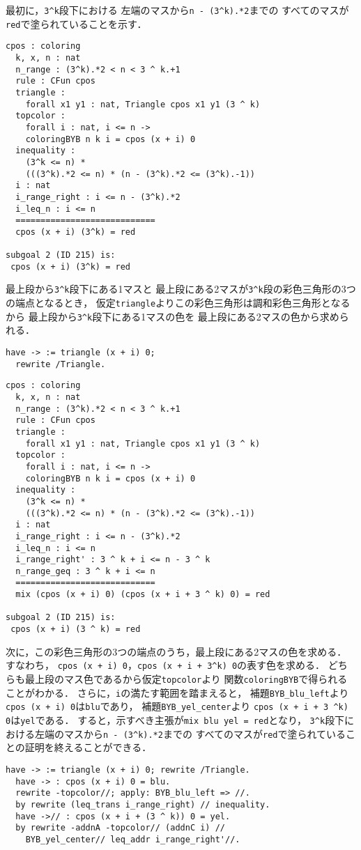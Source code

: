 最初に，{\tt{3\verb|^|k}}段下における
左端のマスから{\tt{n - (3\verb|^|k).*2}}までの
すべてのマスが{\tt{red}}で塗られていることを示す．
\begin{lstlisting}[language=Coq]
  cpos : coloring
  k, x, n : nat
  n_range : (3^k).*2 < n < 3 ^ k.+1
  rule : CFun cpos
  triangle :
    forall x1 y1 : nat, Triangle cpos x1 y1 (3 ^ k)
  topcolor :
    forall i : nat, i <= n ->
    coloringBYB n k i = cpos (x + i) 0
  inequality :
    (3^k <= n) *
    (((3^k).*2 <= n) * (n - (3^k).*2 <= (3^k).-1))
  i : nat
  i_range_right : i <= n - (3^k).*2
  i_leq_n : i <= n
  ============================
  cpos (x + i) (3^k) = red

subgoal 2 (ID 215) is:
 cpos (x + i) (3^k) = red
\end{lstlisting}
最上段から{\tt{3\verb|^|k}}段下にある1マスと
最上段にある2マスが{\tt{3\verb|^|k}}段の彩色三角形の3つの端点となるとき，
仮定{\tt{triangle}}よりこの彩色三角形は調和彩色三角形となるから
最上段から{\tt{3\verb|^|k}}段下にある1マスの色を
最上段にある2マスの色から求められる．
\begin{lstlisting}[language=Coq]
  have -> := triangle (x + i) 0;
  rewrite /Triangle.
\end{lstlisting}
\begin{lstlisting}[language=Coq]
  cpos : coloring
  k, x, n : nat
  n_range : (3^k).*2 < n < 3 ^ k.+1
  rule : CFun cpos
  triangle :
    forall x1 y1 : nat, Triangle cpos x1 y1 (3 ^ k)
  topcolor :
    forall i : nat, i <= n ->
    coloringBYB n k i = cpos (x + i) 0
  inequality :
    (3^k <= n) *
    (((3^k).*2 <= n) * (n - (3^k).*2 <= (3^k).-1))
  i : nat
  i_range_right : i <= n - (3^k).*2
  i_leq_n : i <= n
  i_range_right' : 3 ^ k + i <= n - 3 ^ k
  n_range_geq : 3 ^ k + i <= n
  ============================
  mix (cpos (x + i) 0) (cpos (x + i + 3 ^ k) 0) = red

subgoal 2 (ID 215) is:
 cpos (x + i) (3 ^ k) = red
\end{lstlisting}
次に，この彩色三角形の3つの端点のうち，最上段にある2マスの色を求める．
すなわち，
{\tt{cpos (x + i) 0}}，{\tt{cpos (x + i + 3\verb|^|k) 0}}の表す色を求める．
どちらも最上段のマス色であるから仮定{\tt{topcolor}}より
関数{\tt{coloringBYB}}で得られることがわかる．
さらに，{\tt{i}}の満たす範囲を踏まえると，
補題{\tt{BYB\_blu\_left}}より
{\tt{cpos (x + i) 0}}は{\tt{blu}}であり，
補題{\tt{BYB\_yel\_center}}より
{\tt{cpos (x + i + 3 \verb|^|k) 0}}は{\tt{yel}}である．
すると，示すべき主張が{\tt{mix blu yel = red}}となり，
{\tt{3\verb|^|k}}段下における左端のマスから{\tt{n - (3\verb|^|k).*2}}までの
すべてのマスが{\tt{red}}で塗られていることの証明を終えることができる．
\begin{lstlisting}[language=Coq]
  have -> := triangle (x + i) 0; rewrite /Triangle.
  have -> : cpos (x + i) 0 = blu.
  rewrite -topcolor//; apply: BYB_blu_left => //.
  by rewrite (leq_trans i_range_right) // inequality.
  have ->// : cpos (x + i + (3 ^ k)) 0 = yel.
  by rewrite -addnA -topcolor// (addnC i) //
    BYB_yel_center// leq_addr i_range_right'//.
\end{lstlisting}

